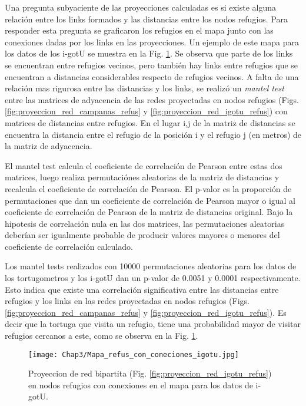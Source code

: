 Una pregunta subyaciente de las proyecciones calculadas es si existe alguna relación entre los links formados y las distancias entre los nodos refugios. Para responder esta pregunta se graficaron los refugios en el mapa junto con las conexiones dadas por los links en las proyecciones. Un ejemplo de este mapa para los datos de los i-gotU se muestra en la Fig. \ref{fig:mapa_con_conexiones_igotu}. Se observa que parte de los links se encuentran entre refugios vecinos, pero también hay links entre refugios que se encuentran a distancias considerables respecto de refugios vecinos. A falta de una relación mas rigurosa entre las distancias y los links, se realizó un \textit{mantel test} \cite{MantelTest} entre las matrices de adyacencia de las redes proyectadas en nodos refugios (Figs. \ref{fig:proyeccion_red_campanas_refus} y \ref{fig:proyeccion_red_igotu_refus}) con matrices de distancias entre refugios. En el lugar i,j de la matriz de distancias se encuentra la distancia entre el refugio  de la posición i y el refugio j (en metros) de la matriz de adyacencia. 

El mantel test calcula el coeficiente de correlación de Pearson entre estas dos matrices, luego realiza permutaciónes aleatorias de la matriz de distancias y recalcula el coeficiente de correlación de Pearson. El p-valor es la proporción de permutaciones que dan un coeficiente de correlación de Pearson mayor o igual al coeficiente de correlación de Pearson de la matriz de distancias original. Bajo la hipotesis de correlación nula en las dos matrices, las permutaciones aleatorias deberían ser igualmente probable de producir valores mayores o menores del coeficiente de correlación calculado. 


Los mantel tests realizados con 10000 permutaciones aleatorias para los datos de los tortugometros y los i-gotU dan un p-valor de 0.0051 y 0.0001 respectivamente. Esto indica que existe una correlación significativa entre las distancias entre refugios y los links en las redes proyectadas en nodos refugios (Figs. \ref{fig:proyeccion_red_campanas_refus} y \ref{fig:proyeccion_red_igotu_refus}). Es decir que la tortuga que visita un refugio, tiene una probabilidad mayor de visitar refugios cercanos a este, como se observa en la Fig. \ref{fig:mapa_con_conexiones_igotu}.

\begin{figure}[ht]
    \begin{center}
        \texttt{[image: Chap3/Mapa\_refus\_con\_coneciones\_igotu.jpg]}
        \caption[Proyeccion en nodos refugios con conexiones en el mapa.]{Proyeccion de red bipartita (Fig. \ref{fig:proyeccion_red_igotu_refus}) en nodos refugios con conexiones en el mapa para los datos de i-gotU. } 
        \label{fig:mapa_con_conexiones_igotu}
        
        \end{center}
\end{figure} 

